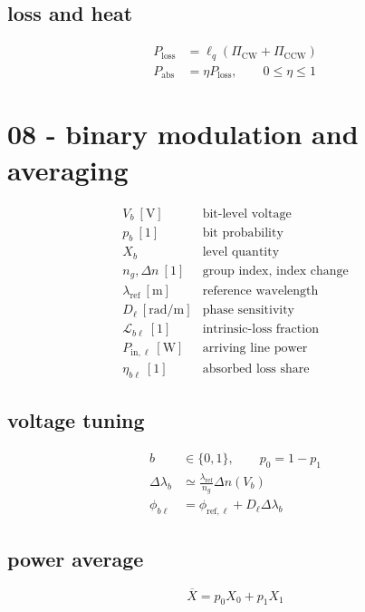 \subsection*{loss and heat}
\[
\displaystyle \begin{aligned}P_{\mathrm{loss}}&=\ell_q(\Pi_{\mathrm{CW}}+\Pi_{\mathrm{CCW}})\\P_{\mathrm{abs}}&=\eta P_{\mathrm{loss}},\qquad0\le\eta\le1\end{aligned}
\]

\clearpage
\section*{08 - binary modulation and averaging}

\[
\begin{array}{ll}V_b\ [\mathrm V]&\text{bit-level voltage}\\[0.6em]p_b\ [1]&\text{bit probability}\\[0.6em]X_b&\text{level quantity}\\[0.6em]n_g,\Delta n\ [1]&\text{group index, index change}\\[0.6em]\lambda_{\mathrm{ref}}\ [\mathrm m]&\text{reference wavelength}\\[0.6em]D_\ell\ [\mathrm{rad/m}]&\text{phase sensitivity}\\[0.6em]\mathcal L_{b\ell}\ [1]&\text{intrinsic-loss fraction}\\[0.6em]P_{\mathrm{in},\ell}\ [\mathrm W]&\text{arriving line power}\\[0.6em]\eta_{b\ell}\ [1]&\text{absorbed loss share}\end{array}
\]

\subsection*{voltage tuning}
\[
\displaystyle \begin{aligned}b&\in\{0,1\},\qquad p_0=1-p_1\\\Delta\lambda_b&\simeq\frac{\lambda_{\mathrm{ref}}}{n_g}\Delta n(V_b)\\\phi_{b\ell}&=\phi_{\mathrm{ref},\ell}+D_\ell\Delta\lambda_b\end{aligned}
\]

\subsection*{power average}
\[
\displaystyle \overline X=p_0X_0+p_1X_1
\]

